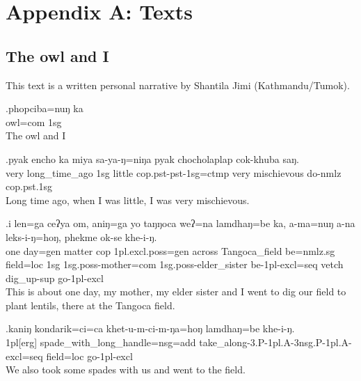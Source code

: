 \chapter*{Appendix A: Texts}\label{app-texts}
\section*{The owl and I}

\noindent This text is a written personal narrative by Shantila Jimi (Kathmandu/Tumok). 

\setcounter{ExNo}{0}

\exg.phopciba=nuŋ   ka\\
 owl{\sc =com} {\sc 1sg}\\
The owl and I

\exg.pyak encho         ka  miya   sa-ya-ŋ=niŋa                pyak chocholaplap cok-khuba      saŋ.\\
 very long\_time\_ago {\sc 1sg} little {\sc cop.pst-pst-1sg=ctmp} very mischievous  do{\sc -nmlz} {\sc cop.pst.1sg}\\
Long time ago, when I was little, I was very mischievous.

\exg.i    len=ga    ceʔya om,  aniŋ=ga  yo taŋŋoca weʔ=na lamdhaŋ=be    ka,  a-ma=nuŋ  a-na leks-i-ŋ=hoŋ, phekme ok-se khe-i-ŋ.\\
 one day=gen matter {\sc cop} {\sc 1pl.excl.poss=gen} across  Tangoca\_field   be{\sc =nmlz.sg} field{\sc =loc} {\sc 1sg} {\sc 1sg.poss-}mother{\sc =com}  {\sc 1sg.poss-}elder\_sister be{\sc -1pl-excl=seq}  vetch  dig\_up{\sc -sup} go{\sc -1pl-excl}\\
This is about one day, my mother, my elder sister and I went to dig our field to plant lentils, there at the Tangoca field.

\exg.kaniŋ   kondarik=ci=ca                         khet-u-m-ci-m-ŋa=hoŋ                                 lamdhaŋ=be    khe-i-ŋ.\\
 {\sc 1pl[erg]} spade\_with\_long\_handle{\sc =nsg=add} take\_along{\sc -3.P-1pl.A-3nsg.P-1pl.A-excl=seq}  field{\sc  =loc} go{\sc -1pl-excl}\\
We also took some spades with us and went to the field.

